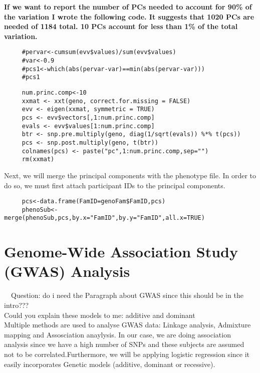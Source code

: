 \documentclass{ar2e}
\begin{document}
\textbf{If we want to report the number of PCs needed to account for 90\% of the variation I wrote the following code.  It suggests that 1020 PCs are needed of 1184 total.  10 PCs account for less than 1\% of the total variation.}
\begin{verbatim}
     #pervar<-cumsum(evv$values)/sum(evv$values)
     #var<-0.9
     #pcs1<-which(abs(pervar-var)==min(abs(pervar-var)))
     #pcs1
\end{verbatim}

\begin{samepage}
\begin{verbatim}
     num.princ.comp<-10
     xxmat <- xxt(geno, correct.for.missing = FALSE)
     evv <- eigen(xxmat, symmetric = TRUE)
     pcs <- evv$vectors[,1:num.princ.comp]
     evals <- evv$values[1:num.princ.comp]
     btr <- snp.pre.multiply(geno, diag(1/sqrt(evals)) %*% t(pcs))
     pcs <- snp.post.multiply(geno, t(btr))
     colnames(pcs) <- paste("pc",1:num.princ.comp,sep="")
     rm(xxmat)
\end{verbatim}
\end{samepage}
Next, we will merge the principal components with the phenotype file. In order to do so, we must first attach participant IDs to the principal components.

\begin{samepage}
\begin{verbatim}
     pcs<-data.frame(FamID=genoFam$FamID,pcs)
     phenoSub<-merge(phenoSub,pcs,by.x="FamID",by.y="FamID",all.x=TRUE)
\end{verbatim}
\end{samepage}

\section{Genome-Wide Association Study (GWAS) Analysis}

~~Question: do i need the Paragraph about GWAS since this should be in the intro???\\

Could you explain these models to me: additive and dominant\\

Multiple methods are used to analyse GWAS data: Linkage analysis, Admixture mapping and Assosciation anaylysis. In our case, we are doing association analysis since we have a high number of SNPs and these subjects are assumed not to be correlated.Furthermore, we will be applying logistic regression since it easily incorporates Genetic models (additive, dominant or recessive).\\
\end{document}
